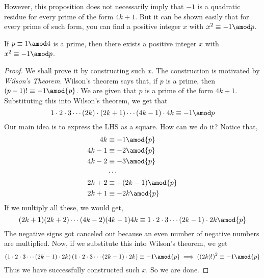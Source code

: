 \documentclass[11pt]{scrartcl}
\begin{document}
However, this proposition does not necessarily imply that \(-1\) is a quadratic residue for every prime of the form \(4k+1\). But it can be shown easily that for every prime of such form, you can find a positive integer \(x\) with \(x^2 \equiv -1 \amod p\).
\begin{lemma}
If \(p\equiv 1 \amod 4\) is a prime, then there exists a positive integer \(x\) with \(x^2 \equiv -1 \amod p\).
\end{lemma}
\begin{proof}
We shall prove it by constructing such \(x\). The construction is motivated by \textit{Wilson's Theorem}. Wilson's theorem says that, if \(p\) is a prime, then \((p-1)! \equiv -1 \amod{p}\). We are given that \(p\) is a prime of the form \(4k+1\). Substituting this into Wilson's theorem, we get that
\[1 \cdot 2 \cdot 3  \cdots (2k) \cdot (2k+1) \cdots (4k-1) \cdot 4k \equiv -1 \amod p\]
Our main idea is to express the LHS as a square. How can we do it? Notice that,
\begin{equation*}
\begin{split}
4k &\equiv -1 \amod{p} \\
4k-1 &\equiv -2 \amod{p} \\
4k-2 &\equiv -3 \amod{p} \\
&\cdots \\
2k+2 &\equiv -(2k-1) \amod{p} \\
2k+1 &\equiv -2k \amod{p}
\end{split}
\end{equation*}
If we multiply all these, we would get, 
\[(2k+1)(2k+2)\cdots (4k-2)(4k-1)4k \equiv 1 \cdot 2 \cdot 3 \cdots (2k-1)\cdot 2k \amod{p}\]
The negative signs got canceled out because an even number of negative numbers are multiplied. Now, if we substitute this into Wilson's theorem, we get
\[\left(1 \cdot 2 \cdot 3 \cdots (2k-1)\cdot 2k\right)\left(1 \cdot 2 \cdot 3 \cdots (2k-1)\cdot 2k\right) \equiv -1 \amod{p} \implies \left((2k)!\right)^2 \equiv -1 \amod{p}\]
Thus we have successfully constructed such \(x\). So we are done.
\end{proof}
\end{document}
